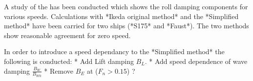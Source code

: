 A study of the has been conducted which shows the roll damping components for various speeds. Calculations with *Ikeda original method* and the *Simplified method* have been carried for two ships (*S175* and *Faust*). The two methods show reasonable agreement for zero speed.

In order to introduce a speed dependancy to the *Simplified method* the following is conducted:
* Add Lift damping $B_L$.
* Add speed dependence of wave damping $\frac{B_W}{B_{W0}}$
* Remove $B_E$ at ($F_n>0.15$) ?


